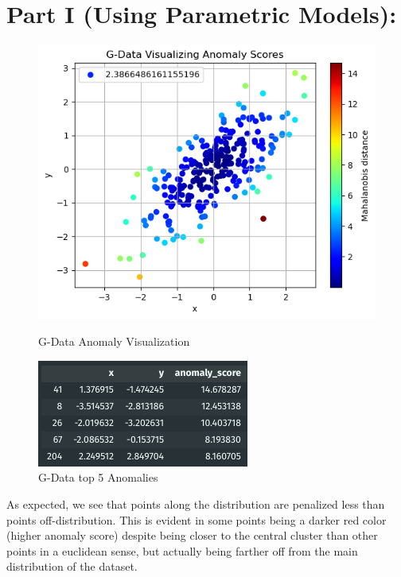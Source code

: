 \documentclass{article}
\begin{document}
\section{Part I (Using Parametric Models):}
\begin{figure}[H]
    \centering
    \begin{minipage}[b]{0.59\textwidth}
        \centering
        \includegraphics[width=\textwidth]{p1_p.png}
        \caption{G-Data Anomaly Visualization}
    \end{minipage}
    \hfill
    \begin{minipage}[b]{0.4\textwidth}
        \centering
        \includegraphics[width=\textwidth]{p1_d.png}
        \caption{G-Data top 5 Anomalies}
    \end{minipage}
\end{figure}

As expected, we see that points along the distribution are penalized less than points
off-distribution. This is evident in some points being a darker red color (higher anomaly score)
despite being closer to the central cluster than other points in a euclidean sense, but actually
being farther off from the main distribution of the dataset. 
\end{document}
